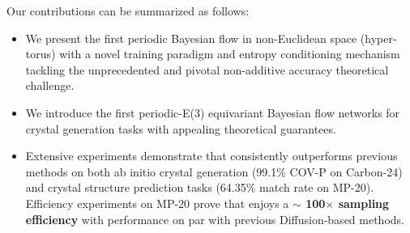 Our contributions can be summarized as follows:
\begin{itemize}
    \item We present the first periodic Bayesian flow in non-Euclidean space (hyper-torus) with a novel training paradigm and entropy conditioning mechanism tackling the unprecedented and pivotal non-additive accuracy theoretical challenge.
    \item We introduce the first periodic-E(3) equivariant Bayesian flow networks for crystal generation tasks with appealing theoretical guarantees.
    \item Extensive experiments demonstrate that \modelname consistently outperforms previous methods on both ab initio crystal generation (99.1\% COV-P on Carbon-24) and crystal structure prediction tasks (64.35$\%$ match rate on MP-20). Efficiency experiments on MP-20 prove that \modelname enjoys a \textbf{$\sim$ 100$\times$ sampling efficiency} with performance on par with previous Diffusion-based methods.
\end{itemize}




